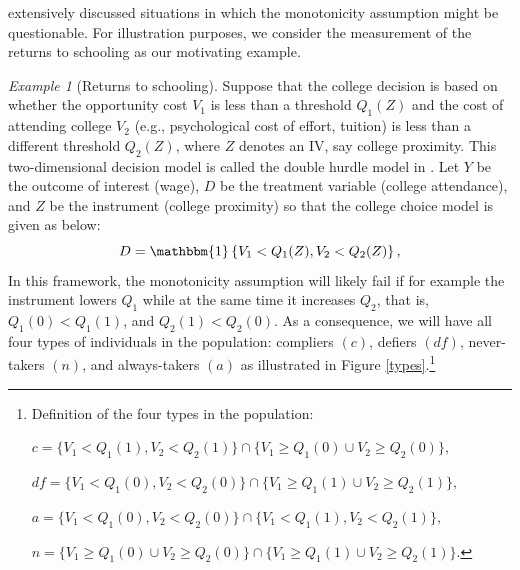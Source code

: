 \documentclass[12pt]{article}
\theoremstyle{plain}
\theoremstyle{definition}
\theoremstyle{remark}
\newtheorem{example}{Example}%
\begin{document}
\cite{Fiorini2021ScrutinizingDesigns} extensively discussed situations in which the monotonicity assumption might be questionable. 
For illustration purposes, we consider the measurement of the returns to schooling as our motivating example. %
\begin{example}[Returns to schooling]
     Suppose that the college decision is based on whether the opportunity cost $V_1$ is less than a threshold $Q_1(Z)$ and the cost of attending college $V_2$ (e.g., psychological cost of effort, tuition) is less than a different threshold $Q_2(Z)$, where $Z$ denotes an IV, say college proximity. This two-dimensional decision model is called the double hurdle model in \cite{Lee2018IdentifyingTreatments}. Let $Y$ be the outcome of interest (wage), $D$ be the treatment variable (college attendance), and $Z$ be the instrument (college proximity) so that the college choice model is given as below: 
\begin{equation}
D= \mathbbm{1}\left\{V_1 < Q_1(Z), V_2 < Q_2(Z) \right \},
\end{equation}
In this framework, the monotonicity assumption will likely fail if for example the instrument lowers $Q_1$ while at the same time it increases $Q_2$, that is, $Q_1(0) < Q_1(1)$, and $Q_2(1) < Q_2(0)$. As a consequence, we will have all four types of individuals in the population: compliers $(c)$, defiers $(df)$, never-takers $(n)$, and always-takers $(a)$ as illustrated in Figure \ref{types}.\footnote{Definition of the four types in the population:

$c=\{V_1 < Q_1(1),V_2 < Q_2(1)\}\cap\{V_1 \geq Q_1(0)\cup V_2 \geq Q_2(0)\},$

$df=\{V_1 < Q_1(0),V_2 < Q_2(0)\}\cap\{V_1 \geq Q_1(1)\cup V_2 \geq Q_2(1)\},$

$a=\{V_1 < Q_1(0),V_2 < Q_2(0)\}\cap\{V_1 < Q_1(1), V_2 < Q_2(1)\},$

$n=\{V_1 \geq Q_1(0)\cup V_2 \geq Q_2(0)\}\cap\{V_1 \geq Q_1(1)\cup V_2 \geq Q_2(1)\}$.}


\begin{figure}   
    \centering
\begin{tikzpicture}[x=0.75pt,y=0.75pt,yscale=-1,xscale=1]


\end{tikzpicture}
\end{figure}
\end{example}
\end{document}
